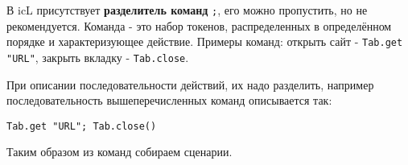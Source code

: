 \begin{sourcecode}
	\label{unreadable}
    \inputminted[linenos]{icl}{../sources/unreadable.icL}
\end{sourcecode}

В icL присутствует \textbf{разделитель команд} \texttt{;}, его можно пропустить, но не рекомендуется. Команда - это набор токенов, распределенных в определённом порядке и характеризующее действие. Примеры команд: открыть сайт - \texttt{Tab.get "URL"}, закрыть вкладку - \texttt{Tab.close}.

При описании последовательности действий, их надо разделить, например последовательность вышеперечисленных команд описывается так:
\begin{verbatim}
Tab.get "URL"; Tab.close()
\end{verbatim}

Таким образом из команд собираем сценарии.

\begin{sourcecode}
	\label{readable}
    \inputminted[linenos]{icl}{../sources/readable.icL}
\end{sourcecode}

